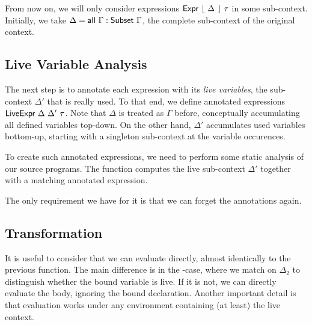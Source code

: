 \documentclass[11pt,a4paper]{article}
\newcommand{\AgdaFloor}[1]{\AgdaFunction{$\lfloor$}\ #1\ \AgdaFunction{$\rfloor$}}
\begin{document}
From now on, we will only consider expressions
$\AgdaDatatype{Expr}\ \AgdaFloor{\Delta}\ \tau$ in some sub-context.
Initially, we take $\Delta = \AgdaFunction{all}\ \Gamma : \AgdaDatatype{Subset}\ \Gamma$,
the complete sub-context of the original context.


\subsection{Live Variable Analysis}

The next step is to annotate each expression with its \emph{live variables},
the sub-context $\Delta'$ that is really used.
To that end, we define annotated expressions
$\AgdaDatatype{LiveExpr}\ \Delta\ \Delta'\ \tau$.
Note that $\Delta$ is treated as $\Gamma$ before,
conceptually accumulating all defined variables top-down.
On the other hand, $\Delta'$ accumulates used variables bottom-up,
starting with a singleton sub-context at the variable occurences.

\CodeLiveExpr

To create such annotated expressions, we need to perform
some static analysis of our source programs.
The function  computes the live sub-context $\Delta'$
together with a matching annotated expression.

\CodeLiveAnalyse

The only requirement we have for it is that we can forget the annotations again.

\CodeLiveForgetSignature

\CodeLiveAnalysePreservesSignature


\subsection{Transformation}

It is useful to consider that we can evaluate  directly,
almost identically to the previous  function.
The main difference is in the -case,
where we match on $\Delta_2$ to distinguish whether the bound variable is live.
If it is not, we can directly evaluate the body, ignoring the bound declaration.
Another important detail is that evaluation works under any environment containing (at least) the live context.

\CodeLiveEvalLive
\end{document}
